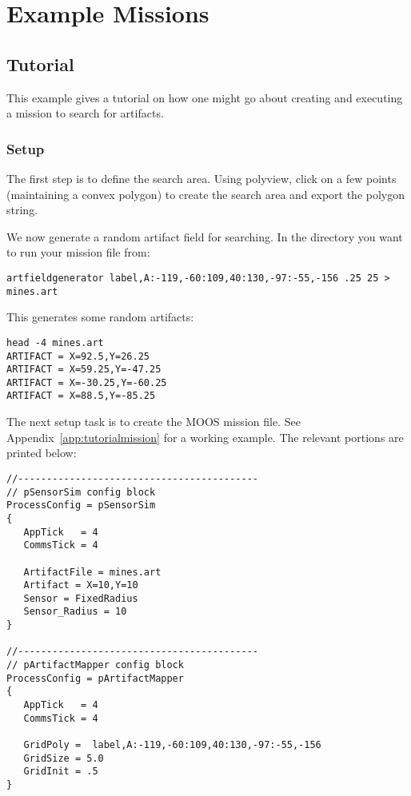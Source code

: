 \section{Example Missions}
\label{examples}

\subsection{Tutorial}
\label{ex:tutorial}
This example gives a tutorial on how one might go about creating and executing a mission to search for artifacts.

\subsubsection{Setup}
\label{ex:tutorial:setup}
The first step is to define the search area.  Using polyview, click on a few points (maintaining a convex polygon) to create the search area and export the polygon string.


We now generate a random artifact field for searching.  In the directory you want to run your mission file from:

\scriptsize
{\tt artfieldgenerator label,A:-119,-60:109,40:130,-97:-55,-156 .25 25 > mines.art}
\normalsize

This generates some random artifacts:

\scriptsize
\begin{verbatim}
head -4 mines.art 
ARTIFACT = X=92.5,Y=26.25
ARTIFACT = X=59.25,Y=-47.25
ARTIFACT = X=-30.25,Y=-60.25
ARTIFACT = X=88.5,Y=-85.25
\end{verbatim}
\normalsize

The next setup task is to create the MOOS mission file.  See Appendix~\ref{app:tutorialmission} for a working example.  The relevant portions are printed below:
\scriptsize
\begin{verbatim}
//------------------------------------------
// pSensorSim config block
ProcessConfig = pSensorSim
{
   AppTick   = 4
   CommsTick = 4
   
   ArtifactFile = mines.art
   Artifact = X=10,Y=10
   Sensor = FixedRadius
   Sensor_Radius = 10   
}

//------------------------------------------
// pArtifactMapper config block
ProcessConfig = pArtifactMapper
{
   AppTick   = 4
   CommsTick = 4
   
   GridPoly =  label,A:-119,-60:109,40:130,-97:-55,-156
   GridSize = 5.0
   GridInit = .5
}
\end{verbatim}
\normalsize

